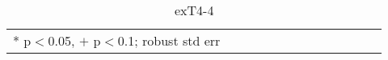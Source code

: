 \documentclass[10pt, letterpaper]{article}
\begin{document}
\begin{spacing}{1.4}













\begin{spacing}{.9} \begin{table}[H]\centering  \label{exT4-4} \begin{scriptsize} \begin{tabular}{p{1.8in}p{.5in}p{.5in}p{.5in}p{.5in}p{.5in}p{.5in}p{.5in}p{.5in}p{.5in}p{.5 in}p{.5in}p{.5 in}}\hline  \hline   * p$<$0.05, $+$ p$<$0.1; robust std err \end{tabular}\end{scriptsize}\caption{exT4-4}\end{table} \end{spacing}


\end{spacing}
\end{document}
